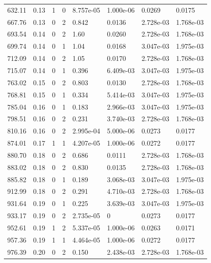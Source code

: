 \documentclass[preview]{standalone}
\begin{document}
{{{\begin{tabular}{L{1.2cm}C{1.2cm} C{0.3cm}C{0.5cm} C{1.4cm}C{1.4cm} C{1.4cm}C{1.4cm}}
  632.11  &  0.13  & 1     &  0 &  8.757e-05  & 1.000e-06  & 0.0269 &  0.0175   \\ 
  667.76  &  0.13  & 0     &  2 &  0.842  & 0.0136  & 2.728e-03 &  1.768e-03   \\ 
  693.54  &  0.14  & 0     &  2 &  1.60  & 0.0260  & 2.728e-03 &  1.768e-03   \\ 
  699.74  &  0.14  & 0     &  1 &  1.04  & 0.0168  & 3.047e-03 &  1.975e-03   \\ 
  712.09  &  0.14  & 0     &  2 &  1.05  & 0.0170  & 2.728e-03 &  1.768e-03   \\ 
  715.07  &  0.14  & 0     &  1 &  0.396  & 6.409e-03  & 3.047e-03 &  1.975e-03   \\ 
  763.02  &  0.15  & 0     &  2 &  0.803  & 0.0130  & 2.728e-03 &  1.768e-03   \\ 
  768.81  &  0.15  & 0     &  1 &  0.334  & 5.414e-03  & 3.047e-03 &  1.975e-03   \\ 
  785.04  &  0.16  & 0     &  1 &  0.183  & 2.966e-03  & 3.047e-03 &  1.975e-03   \\ 
  798.51  &  0.16  & 0     &  2 &  0.231  & 3.740e-03  & 2.728e-03 &  1.768e-03   \\ 
  810.16  &  0.16  & 0     &  2 &  2.995e-04  & 5.000e-06  & 0.0273 &  0.0177   \\ 
  874.01  &  0.17  & 1     &  1 &  4.207e-05  & 1.000e-06  & 0.0272 &  0.0177   \\ 
  880.70  &  0.18  & 0     &  2 &  0.686  & 0.0111  & 2.728e-03 &  1.768e-03   \\ 
  883.02  &  0.18  & 0     &  2 &  0.830  & 0.0135  & 2.728e-03 &  1.768e-03   \\ 
  885.82  &  0.18  & 0     &  1 &  0.189  & 3.068e-03  & 3.047e-03 &  1.975e-03   \\ 
  912.99  &  0.18  & 0     &  2 &  0.291  & 4.710e-03  & 2.728e-03 &  1.768e-03   \\ 
  931.64  &  0.19  & 0     &  1 &  0.225  & 3.639e-03  & 3.047e-03 &  1.975e-03   \\ 
  933.17  &  0.19  & 0     &  2 &  2.735e-05  & 0  & 0.0273 &  0.0177   \\ 
  952.61  &  0.19  & 1     &  2 &  5.337e-05  & 1.000e-06  & 0.0263 &  0.0171   \\ 
  957.36  &  0.19  & 1     &  1 &  4.464e-05  & 1.000e-06  & 0.0272 &  0.0177   \\ 
  976.39  &  0.20  & 0     &  2 &  0.150  & 2.438e-03  & 2.728e-03 &  1.768e-03   \\ 

\end{tabular}}}}
\end{document}
